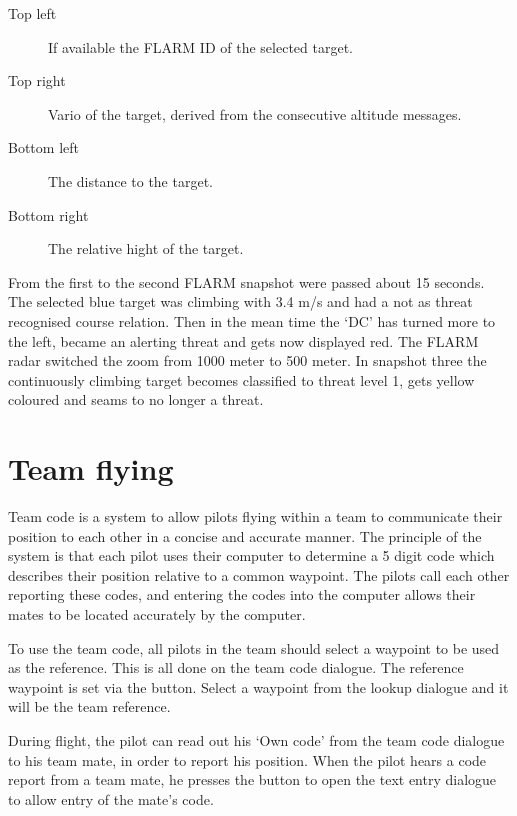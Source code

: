 \begin{description}
\item[Top left]  If available the FLARM ID of the selected target.
\item[Top right]  Vario of the target, derived from the consecutive altitude
messages.
\item[Bottom left]  The distance to the target.
\item[Bottom right]  The relative hight of the target. 
\end{description}

From the first to the second FLARM snapshot were passed about 15 seconds. The
selected blue target was climbing with 3.4 m/s and had a not as threat
recognised course relation.  Then in the mean time the `DC' has turned more to
the left, became an alerting threat and gets now displayed red.  The FLARM
radar switched the zoom from 1000 meter to 500 meter. In snapshot three the
continuously climbing target becomes classified to threat level 1, gets yellow 
coloured and seams to no longer a threat.


\section{Team flying}\label{sec:team-flying}

Team code is a system to allow pilots flying within a team to 
communicate their position to each other in a concise and accurate 
manner.  The principle of the system is that each pilot uses their 
computer to determine a 5 digit code which describes their position 
relative to a common waypoint.  The pilots call each other reporting 
these codes, and entering the codes into the computer allows their 
mates to be located accurately by the computer. 

To use the team code, all pilots in the team should select a waypoint to 
be used as the reference.  This is all done on the team code dialogue. 
The reference waypoint is set 
via the  button. Select a waypoint from the lookup dialogue 
and it will be the team reference.

During flight, the pilot can read out his `Own code' from the team 
code dialogue to his team mate, in order to report his position.  When 
the pilot hears a code report from a team mate, he presses the  
button to open the text entry dialogue to allow entry of the mate's code.

